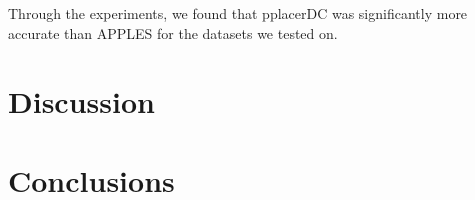 \documentclass[10pt]{article}
\begin{document}



Through the experiments, we found that pplacerDC was significantly more accurate than APPLES for the datasets we tested on.


\section{Discussion}


\section{Conclusions}




\end{document}

